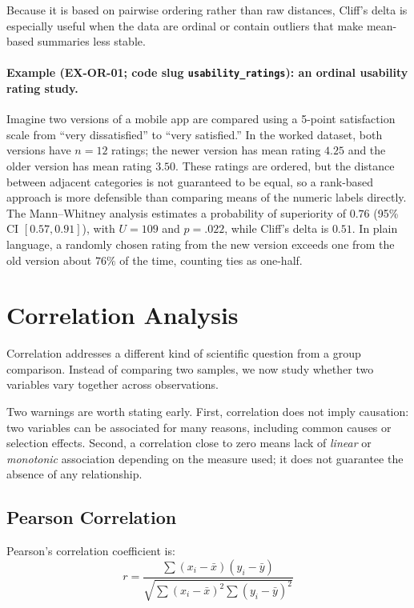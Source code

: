 \documentclass[11pt]{article}
\begin{document}
Because it is based on pairwise ordering rather than raw distances, Cliff's delta is especially useful when the data are ordinal or contain outliers that make mean-based summaries less stable.

\paragraph{Example (EX-OR-01; code slug \texttt{usability\_ratings}): an ordinal usability rating study.}
Imagine two versions of a mobile app are compared using a 5-point satisfaction scale from ``very dissatisfied'' to ``very satisfied.'' In the worked dataset, both versions have $n = 12$ ratings; the newer version has mean rating $4.25$ and the older version has mean rating $3.50$. These ratings are ordered, but the distance between adjacent categories is not guaranteed to be equal, so a rank-based approach is more defensible than comparing means of the numeric labels directly. The Mann--Whitney analysis estimates a probability of superiority of $0.76$ (95\% CI $[0.57, 0.91]$), with $U = 109$ and $p = .022$, while Cliff's delta is $0.51$. In plain language, a randomly chosen rating from the new version exceeds one from the old version about $76\%$ of the time, counting ties as one-half.

\section{Correlation Analysis}

Correlation addresses a different kind of scientific question from a group comparison. Instead of comparing two samples, we now study whether two variables vary together across observations.

Two warnings are worth stating early. First, correlation does not imply causation: two variables can be associated for many reasons, including common causes or selection effects. Second, a correlation close to zero means lack of \emph{linear} or \emph{monotonic} association depending on the measure used; it does not guarantee the absence of any relationship.

\subsection{Pearson Correlation}

Pearson's correlation coefficient is:
\begin{equation}
r = \frac{\sum (x_i - \bar{x})(y_i - \bar{y})}{\sqrt{\sum (x_i - \bar{x})^2 \sum (y_i - \bar{y})^2}}
\end{equation}
\end{document}
